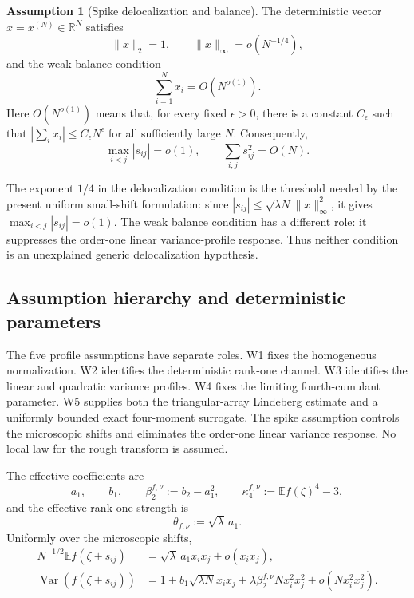 \documentclass[11pt]{article}
\theoremstyle{definition}
\newtheorem{assumption}[theorem]{Assumption}
\theoremstyle{remark}
\newcommand{\E}{\mathbb E}
\newcommand{\R}{\mathbb R}
\newcommand{\Var}{\operatorname{Var}}
\begin{document}
\begin{assumption}[Spike delocalization and balance]\label{ass:spike}
The deterministic vector \(x=x^{(N)}\in\R^N\) satisfies
\[
        \|x\|_2=1,
        \qquad
        \|x\|_\infty=o(N^{-1/4}),
\]
and the weak balance condition
\[
        \sum_{i=1}^N x_i=O(N^{o(1)}).
\]
Here \(O(N^{o(1)})\) means that, for every fixed \(\epsilon>0\), there is a
constant \(C_\epsilon\) such that
\(
 |\sum_i x_i|\le C_\epsilon N^\epsilon
\)
for all sufficiently large \(N\).
Consequently,
\[
        \max_{i<j}|s_{ij}|=o(1),
        \qquad
        \sum_{i,j}s_{ij}^2=O(N).
\]
\end{assumption}

The exponent $1/4$ in the delocalization condition is the threshold needed
by the present uniform small-shift formulation: since
$|s_{ij}|\leq\sqrt{\lambda N}\|x\|_\infty^2$, it gives
$\max_{i<j}|s_{ij}|=o(1)$.  The weak balance condition has a different role:
it suppresses the order-one linear variance-profile response.  Thus neither
condition is an unexplained generic delocalization hypothesis.

\subsection{Assumption hierarchy and deterministic parameters}
\label{subsec:assumption-hierarchy}

The five profile assumptions have separate roles.  W1 fixes the homogeneous
normalization.  W2 identifies the deterministic rank-one channel.  W3
identifies the linear and quadratic variance profiles.  W4 fixes the limiting
fourth-cumulant parameter.  W5 supplies both the triangular-array Lindeberg
estimate and a uniformly bounded exact four-moment surrogate.  The spike
assumption controls the microscopic shifts and eliminates the order-one
linear variance response.  No local law for the rough transform is assumed.

The effective coefficients are
\begin{equation}\label{eq:profile-coeffs}
 a_1,\qquad b_1,\qquad
 \beta_2^{f,\nu}:=b_2-a_1^2,\qquad
 \kappa_4^{f,\nu}:=\E f(\zeta)^4-3,
\end{equation}
and the effective rank-one strength is
\begin{equation}\label{eq:theta-nu}
 \theta_{f,\nu}:=\sqrt\lambda\,a_1.
\end{equation}
Uniformly over the microscopic shifts,
\begin{align}
 N^{-1/2}\E f(\zeta+s_{ij})
 &=\sqrt\lambda\,a_1x_ix_j+o(x_ix_j),
 \label{eq:matrix-mean-expansion}\\
 \Var(f(\zeta+s_{ij}))
 &=1+b_1\sqrt{\lambda N}x_ix_j
 +\lambda\beta_2^{f,\nu}Nx_i^2x_j^2
 +o(Nx_i^2x_j^2).
 \label{eq:matrix-variance-profile}
\end{align}
\end{document}
